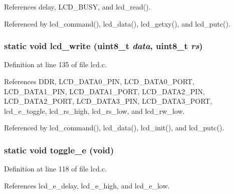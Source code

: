 References delay, LCD\_\-BUSY, and lcd\_\-read().

Referenced by lcd\_\-command(), lcd\_\-data(), lcd\_\-getxy(), and lcd\_\-putc().
\subsubsection{\setlength{\rightskip}{0pt plus 5cm}static void lcd\_\-write (uint8\_\-t {\em data}, uint8\_\-t {\em rs})\hspace{0.3cm}{\tt  [static]}}\label{lcd_8c_6aa4fa5c8ba19268338fa4215fa1807e}




Definition at line 135 of file lcd.c.

References DDR, LCD\_\-DATA0\_\-PIN, LCD\_\-DATA0\_\-PORT, LCD\_\-DATA1\_\-PIN, LCD\_\-DATA1\_\-PORT, LCD\_\-DATA2\_\-PIN, LCD\_\-DATA2\_\-PORT, LCD\_\-DATA3\_\-PIN, LCD\_\-DATA3\_\-PORT, lcd\_\-e\_\-toggle, lcd\_\-rs\_\-high, lcd\_\-rs\_\-low, and lcd\_\-rw\_\-low.

Referenced by lcd\_\-command(), lcd\_\-data(), lcd\_\-init(), and lcd\_\-putc().
\subsubsection{\setlength{\rightskip}{0pt plus 5cm}static void toggle\_\-e (void)\hspace{0.3cm}{\tt  [static]}}\label{lcd_8c_762d0af9ccb3c9507af12cd7617e047d}




Definition at line 118 of file lcd.c.

References lcd\_\-e\_\-delay, lcd\_\-e\_\-high, and lcd\_\-e\_\-low.
